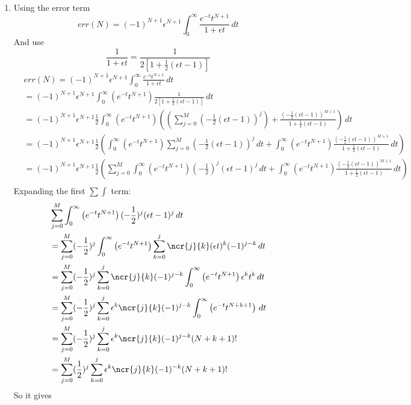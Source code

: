 \documentclass{/home/janmebows/Documents/LatexTemplates/myassignment}
\begin{document}
\begin{enumerate}
\begin{enumerate}
            
        \item  Using the error term
                    \[err(N) = (-1)^{N+1}\epsilon^{N+1}\int_0^\infty  \frac{e^{-t}t^{N+1} }{1+\epsilon t}\,dt\]
        And use 
        \[\frac{1}{1+\epsilon t} = \frac{1}{2[1 + \frac12 (\epsilon t - 1)]}\]
        \begin{align*}
            &err(N) = (-1)^{N+1}\epsilon^{N+1}\int_0^\infty  \frac{e^{-t}t^{N+1} }{1+\epsilon t}\,dt\\
            &=(-1)^{N+1}\epsilon^{N+1}\int_0^\infty  \left(e^{-t}t^{N+1}\right) \frac{1}{2[1 + \frac12 (\epsilon t - 1)]} \,dt\\
            &=(-1)^{N+1}\epsilon^{N+1}\frac12 \int_0^\infty  \left(e^{-t}t^{N+1}\right) \left( \left(\sum_{j=0}^{M} (-\frac12 (\epsilon t - 1))^j\right) + \frac{(-\frac12 (\epsilon t - 1))^{M+1}}{1 + \frac12 (\epsilon t - 1)}\right)\, dt\\
            &=(-1)^{N+1}\epsilon^{N+1}\frac12 \left(\int_0^\infty  \left(e^{-t}t^{N+1}\right) \sum_{j=0}^{M} (-\frac12 (\epsilon t - 1))^j\, dt + \int_0^\infty  \left(e^{-t}t^{N+1}\right)\frac{(-\frac12 (\epsilon t - 1))^{M+1}}{1 + \frac12 (\epsilon t - 1)}\, dt\right)\\
            &=(-1)^{N+1}\epsilon^{N+1}\frac12 \left( \sum_{j=0}^{M}\int_0^\infty  \left(e^{-t}t^{N+1}\right) (-\frac12)^j (\epsilon t - 1)^j\, dt + \int_0^\infty  \left(e^{-t}t^{N+1}\right)\frac{(-\frac12 (\epsilon t - 1))^{M+1}}{1 + \frac12 (\epsilon t - 1)}\, dt\right)\\
        \end{align*}
        Expanding the first $\sum\int$ term:
        \begin{align*}
            &\sum_{j=0}^{M}\int_0^\infty  \left(e^{-t}t^{N+1}\right) (-\frac12)^j (\epsilon t - 1)^j\, dt\\
            &=\sum_{j=0}^{M}(-\frac12)^j\int_0^\infty  \left(e^{-t}t^{N+1}\right) \sum_{k=0}^j \ncr{j}{k} (\epsilon t)^{k} (-1)^{j-k}\, dt\\
            &=\sum_{j=0}^{M}(-\frac12)^j \sum_{k=0}^j \ncr{j}{k}(-1)^{j-k} \int_0^\infty  \left(e^{-t}t^{N+1}\right)\epsilon^k t^{k} \, dt\\
            &=\sum_{j=0}^{M}(-\frac12)^j \sum_{k=0}^j \epsilon^k\ncr{j}{k}(-1)^{j-k} \int_0^\infty  \left(e^{-t}t^{N+k+1}\right)  \, dt\\
            &=\sum_{j=0}^{M}(-\frac12)^j \sum_{k=0}^j \epsilon^k\ncr{j}{k}(-1)^{j-k} (N+k+1)! \\
            &=\sum_{j=0}^{M}(\frac12)^j \sum_{k=0}^j \epsilon^k\ncr{j}{k}(-1)^{-k} (N+k+1)! \\
        \end{align*}
        So it gives
        

\end{enumerate}
\end{enumerate}
\end{document}
